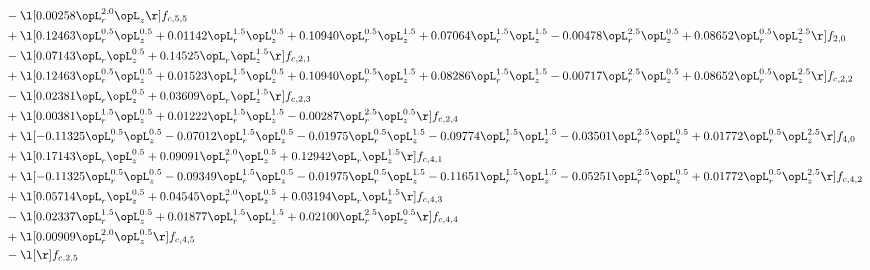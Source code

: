 \begin{alignat}{2}
& - \l[  0.00258 \opL_r^{2.0} \opL_z  \r] f_{c,5,5} \nonumber \\ 
& + \l[  0.12463 \opL_r^{0.5} \opL_z^{0.5} +  0.01142 \opL_r^{1.5} \opL_z^{0.5} +  0.10940 \opL_r^{0.5} \opL_z^{1.5} +  0.07064 \opL_r^{1.5} \opL_z^{1.5}   -0.00478 \opL_r^{2.5} \opL_z^{0.5} +  0.08652 \opL_r^{0.5} \opL_z^{2.5}  \r] f_{2,0} \nonumber \\ 
& - \l[  0.07143 \opL_r \opL_z^{0.5} +  0.14525 \opL_r \opL_z^{1.5}  \r] f_{c,2,1} \nonumber \\ 
& + \l[  0.12463 \opL_r^{0.5} \opL_z^{0.5} +  0.01523 \opL_r^{1.5} \opL_z^{0.5} +  0.10940 \opL_r^{0.5} \opL_z^{1.5} +  0.08286 \opL_r^{1.5} \opL_z^{1.5}   -0.00717 \opL_r^{2.5} \opL_z^{0.5} +  0.08652 \opL_r^{0.5} \opL_z^{2.5}  \r] f_{c,2,2} \nonumber \\ 
& - \l[  0.02381 \opL_r \opL_z^{0.5} +  0.03609 \opL_r \opL_z^{1.5}  \r] f_{c,2,3} \nonumber \\ 
& + \l[  0.00381 \opL_r^{1.5} \opL_z^{0.5} +  0.01222 \opL_r^{1.5} \opL_z^{1.5}   -0.00287 \opL_r^{2.5} \opL_z^{0.5}  \r] f_{c,2,4} \nonumber \\ 
& + \l[  -0.11325 \opL_r^{0.5} \opL_z^{0.5}   -0.07012 \opL_r^{1.5} \opL_z^{0.5}   -0.01975 \opL_r^{0.5} \opL_z^{1.5}   -0.09774 \opL_r^{1.5} \opL_z^{1.5}   -0.03501 \opL_r^{2.5} \opL_z^{0.5} +  0.01772 \opL_r^{0.5} \opL_z^{2.5}  \r] f_{4,0} \nonumber \\ 
& + \l[  0.17143 \opL_r \opL_z^{0.5} +  0.09091 \opL_r^{2.0} \opL_z^{0.5} +  0.12942 \opL_r \opL_z^{1.5}  \r] f_{c,4,1} \nonumber \\ 
& + \l[  -0.11325 \opL_r^{0.5} \opL_z^{0.5}   -0.09349 \opL_r^{1.5} \opL_z^{0.5}   -0.01975 \opL_r^{0.5} \opL_z^{1.5}   -0.11651 \opL_r^{1.5} \opL_z^{1.5}   -0.05251 \opL_r^{2.5} \opL_z^{0.5} +  0.01772 \opL_r^{0.5} \opL_z^{2.5}  \r] f_{c,4,2} \nonumber \\ 
& + \l[  0.05714 \opL_r \opL_z^{0.5} +  0.04545 \opL_r^{2.0} \opL_z^{0.5} +  0.03194 \opL_r \opL_z^{1.5}  \r] f_{c,4,3} \nonumber \\ 
& - \l[  0.02337 \opL_r^{1.5} \opL_z^{0.5} +  0.01877 \opL_r^{1.5} \opL_z^{1.5} +  0.02100 \opL_r^{2.5} \opL_z^{0.5}  \r] f_{c,4,4} \nonumber \\ 
& + \l[  0.00909 \opL_r^{2.0} \opL_z^{0.5}  \r] f_{c,4,5} \nonumber \\ 
& - \l[  \r] f_{c,2,5} \nonumber \\ 
\end{alignat} 


